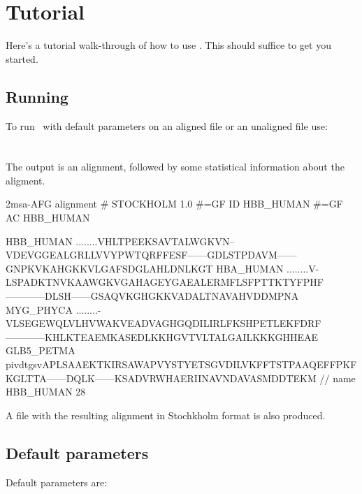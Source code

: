 
\section{Tutorial}
\label{section:tutorial}
\setcounter{footnote}{0}

Here's a tutorial walk-through of how to use \etwomsa. This should
suffice to get you started.

\subsection{Running \etwomsa}
To run \etwomsa\ with default parameters on an aligned file
 or an unaligned file  use:\\

\\
\\

\noindent
The output is an alignment, followed by some statistical information about the aligment.

\begin{sreoutput}
2msa-AFG alignment
# STOCKHOLM 1.0
#=GF ID HBB_HUMAN
#=GF AC HBB_HUMAN

HBB_HUMAN  ........VHLTPEEKSAVTALWGKVN--VDEVGGEALGRLLVVYPWTQRFFESF------GDLSTPDAVM------GNPKVKAHGKKVLGAFSDGLAHLDNLKGT
HBA_HUMAN  ........V-LSPADKTNVKAAWGKVGAHAGEYGAEALERMFLSFPTTKTYFPHF------------DLSH------GSAQVKGHGKKVADALTNAVAHVDDMPNA
MYG_PHYCA  ........-VLSEGEWQLVLHVWAKVEADVAGHGQDILIRLFKSHPETLEKFDRF------------KHLKTEAEMKASEDLKKHGVTVLTALGAILKKKGHHEAE
GLB5_PETMA pivdtgsvAPLSAAEKTKIRSAWAPVYSTYETSGVDILVKFFTSTPAAQEFFPKFKGLTTA------DQLK------KSADVRWHAERIINAVNDAVASMDDTEKM
//
name        %
HBB_HUMAN    28%
\end{sreoutput}

A file   with the resulting alignment in Stochkholm format is also produced.

\subsection{Default parameters}

Default parameters are:

